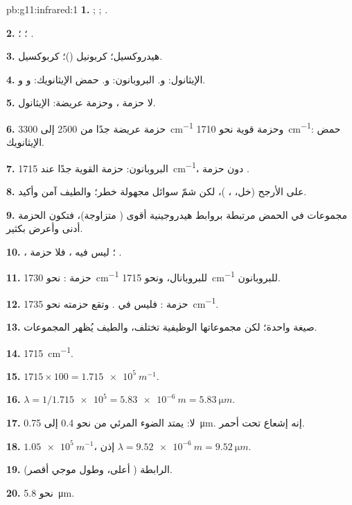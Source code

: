 \begin{solution}{pb:g11:infrared:1}
\textbf{1.} ; ; .

\textbf{2.} ؛ ؛ .

\textbf{3.} هيدروكسيل؛ كربونيل ()؛ كربوكسيل.

\textbf{4.} الإيثانول:  و. البروبانون: 
و. حمض الإيثانويك:  و و.

\textbf{5.} لا حزمة ، وحزمة  عريضة: الإيثانول.

\textbf{6.} حزمة  عريضة جدًا من 2500 إلى \qty{3300}{cm^{-1}}
وحزمة  قوية نحو \qty{1710}{cm^{-1}}: حمض الإيثانويك.

\textbf{7.} البروبانون: حزمة  القوية جدًا عند
\qty{1715}{cm^{-1}}، دون حزمة .

\textbf{8.} على الأرجح (خل، ، )، لكن شمّ سوائل مجهولة
خطر؛ والطيف آمن وأكيد.

\textbf{9.} مجموعات  في الحمض مرتبطة بروابط هيدروجينية أقوى
( متزاوجة)، فتكون الحزمة أدنى وأعرض بكثير.

\textbf{10.} ، ؛ ليس فيه ، فلا حزمة
.

\textbf{11.} حزمة : نحو \qty{1730}{cm^{-1}} للبروبانال،
ونحو \qty{1715}{cm^{-1}} للبروبانون.

\textbf{12.} حزمة : فليس في  . وتقع حزمته 
نحو \qty{1735}{cm^{-1}}.

\textbf{13.}  صيغة واحدة؛ لكن مجموعاتها الوظيفية تختلف،
والطيف يُظهر المجموعات.

\textbf{14.} \qty{1715}{cm^{-1}}.

\textbf{15.} $1715 \times 100 = \qty{1.715e5}{m^{-1}}$.

\textbf{16.} $\lambda = 1/\num{1.715e5} = \qty{5.83e-6}{m} =
\qty{5.83}{\micro m}$.

\textbf{17.} لا: يمتد الضوء المرئي من نحو 0.4 إلى
\qty{0.75}{\micro m}. إنه إشعاع تحت أحمر.

\textbf{18.} $\num{1.05e5}\ \si{m^{-1}}$، إذن $\lambda = \qty{9.52e-6}{m}
= \qty{9.52}{\micro m}$.

\textbf{19.} الرابطة  ( أعلى، وطول موجي أقصر).

\textbf{20.} نحو \qty{5.8}{\micro m}.
\end{solution}
